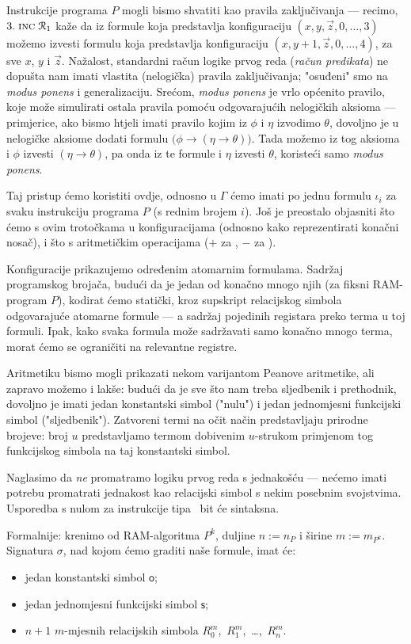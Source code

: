 Instrukcije programa $P$ mogli bismo shvatiti kao pravila zaključivanja --- recimo, $3.\;\textsc{inc}\;\mathcal R_{1}$ kaže da iz formule koja predstavlja konfiguraciju $(x,y,\vec z,0,\dotsc,3)$ možemo izvesti formulu koja predstavlja konfiguraciju $(x,y\!+\!1,\vec z,0,\dotsc,4)$, za sve $x$, $y$ i $\vec z$. Nažalost, standardni račun logike prvog reda (\emph{račun predikata}) ne dopušta nam imati vlastita (nelogička) pravila zaključivanja; "osuđeni" smo na \emph{modus ponens} i generalizaciju. Srećom, \emph{modus ponens} je vrlo općenito pravilo, koje može simulirati ostala pravila pomoću odgovarajućih nelogičkih aksioma --- primjerice, ako bismo htjeli imati pravilo kojim iz $\phi$ i $\eta$ izvodimo $\theta$, dovoljno je u nelogičke aksiome dodati formulu $\bigl(\phi\to(\eta\to\theta)\bigr)$. Tada možemo iz tog aksioma i $\phi$ izvesti $(\eta\to\theta)$, pa onda iz te formule i $\eta$ izvesti $\theta$, koristeći samo \emph{modus ponens}.

Taj pristup ćemo koristiti ovdje, odnosno u $\Gamma$ ćemo imati po jednu formulu $\iota_i$ za svaku instrukciju programa $P$ (s rednim brojem $i$). Još je preostalo objasniti što ćemo s ovim trotočkama u konfiguracijama (odnosno kako reprezentirati konačni nosač), i što s aritmetičkim operacijama ($+$ za \inc, $-$ za \dec).

Konfiguracije prikazujemo određenim atomarnim formulama. Sadržaj programskog brojača, budući da je jedan od konačno mnogo njih (za fiksni RAM-program $P$), kodirat ćemo statički, kroz supskript relacijskog simbola odgovarajuće atomarne formule --- a sadržaj pojedinih registara preko terma u toj formuli. Ipak, kako svaka formula može sadržavati samo konačno mnogo terma, morat ćemo se ograničiti na relevantne registre.

Aritmetiku bismo mogli prikazati nekom
varijantom Peanove aritmetike, ali zapravo možemo i lakše: budući da je sve što nam treba sljedbenik i prethodnik, dovoljno je imati jedan konstantski simbol ("nulu") i jedan jednomjesni funkcijski simbol ("sljedbenik"). Zatvoreni termi na očit način predstavljaju prirodne brojeve: broj $u$ predstavljamo termom dobivenim $u$-strukom primjenom tog funkcijskog simbola na taj konstantski simbol.

Naglasimo da \emph{ne} promatramo logiku prvog reda s jednakošću --- nećemo imati potrebu promatrati jednakost kao relacijski simbol s nekim posebnim svojstvima. Usporedba s nulom za instrukcije tipa \dec\ bit će sintaksna.

Formalnije: krenimo od RAM-algoritma $P^k$, duljine $n:=n_P$ i širine $m:=m_{P^k}$. Signatura $\sigma$, nad kojom ćemo graditi naše formule, imat će:
\begin{itemize}
    \item jedan konstantski simbol $\mathsf o$;
    \item jedan jednomjesni funkcijski simbol $\mathsf s$;
    \item $n+1$ $m$-mjesnih relacijskih simbola $R_0^m$,~$R_1^m$,~\ldots,~$R_n^m$.
\end{itemize}

